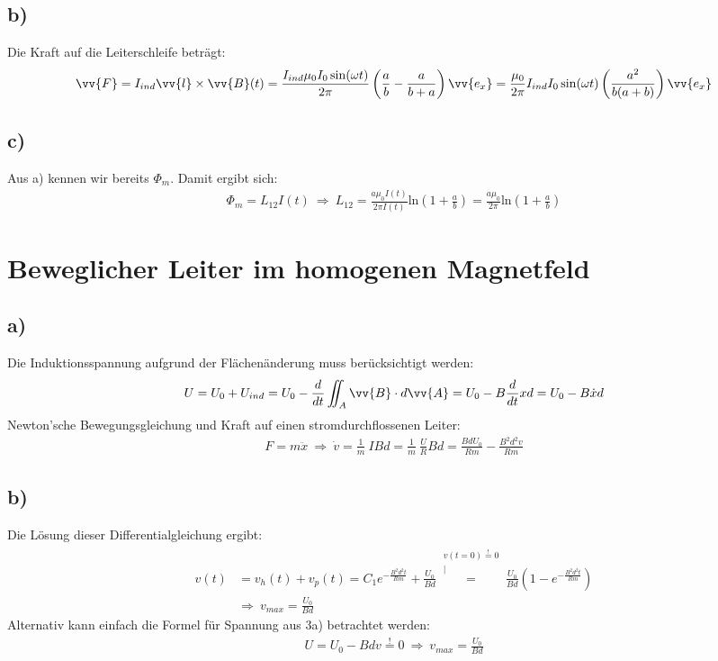 \documentclass[a4paper,12pt]{article}
\begin{document}
\subsection*{b)}
Die Kraft auf die Leiterschleife beträgt:
\begin{align*}
\vv{F} =I_{ind}\vv{l}\times\vv{B}(t) = \frac{I_{ind}\mu_0I_0\sin(\omega t)}{2\pi}\left(\frac{a}{b}-\frac{a}{b+a}\right)\vv{e_x}=\frac{\mu_0}{2\pi}I_{ind}I_0\sin(\omega t)\left(\frac{a^2}{b(a+b)}\right)\vv{e_x}
\end{align*}
\subsection*{c)}
Aus a) kennen wir bereits $\Phi_m$. Damit ergibt sich:
\begin{align*}
\Phi_m = L_{12}I(t)\ \Rightarrow\ L_{12} = \frac{a\mu_0I(t)}{2\pi I(t)}\mathrm{ln}\left(1+\frac{a}{b}\right) = \frac{a\mu_0}{2\pi}\mathrm{ln}\left(1+\frac{a}{b}\right)
\end{align*}
\section{Beweglicher Leiter im homogenen Magnetfeld} 
\subsection*{a)}
Die Induktionsspannung aufgrund der Flächenänderung muss berücksichtigt werden:
\begin{align*}
U=U_0+U_{ind}=U_0-\frac{d}{dt}\iint_A \vv{B}\cdot d\vv{A}=U_0-B\frac{d}{dt}xd=U_0-B\dot{x}d
\end{align*}
Newton'sche Bewegungsgleichung und Kraft auf einen stromdurchflossenen Leiter:
\begin{align*}
F = m\ddot{x}\ \Rightarrow\ \dot{v}=\frac1m\ IBd = \frac1m\ \frac{U}{R}Bd = \frac{BdU_0}{Rm}-\frac{B^2d^2v}{Rm} 
\end{align*}
\subsection*{b)}
Die Lösung dieser Differentialgleichung ergibt:
\begin{align*}
v(t)&=v_h(t)+v_p(t)=C_1e^{-\frac{B^2d^2t}{Rm}}+\frac{U_0}{Bd}\overset{\substack{v(t=0)\overset{!}{=}0 \\|}}{=}\frac{U_0}{Bd}\left(1-e^{-\frac{B^2d^2t}{Rm}}\right)\\
&\Rightarrow\ v_{max} = \frac{U_0}{Bd}
\end{align*}
Alternativ kann einfach die Formel für Spannung aus 3a) betrachtet werden:
\begin{align*}
U = U_0-Bdv\overset{!}{=}0\ \Rightarrow\ v_{max} = \frac{U_0}{Bd}
\end{align*}
\end{document}
